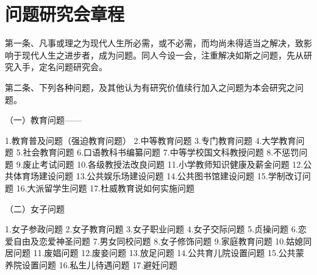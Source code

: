 \section{问题研究会章程}



第一条、凡事或理之为现代人生所必需，或不必需，而均尚未得适当之解决，致影响于现代人生之进步者，成为问题。同人今设一会，注重解决如斯之问题，先从研究入手，定名问题研究会。

第二条、下列各种问题，及其他认为有研究价值续行加入之问题为本会研究之问题。

（一）教育问题——

1.教育普及问题（强迫教育问题）\hspace{1em}
2.中等教育问题\hspace{1em}
3.专门教育问题\hspace{1em}
4.大学教育问题\hspace{1em}
5.社会教育问题\hspace{1em}
6.口语教科书编纂问题\hspace{1em}
7.中等学校国文科教授问题\hspace{1em}
8.不惩罚问题\hspace{1em}
9.废止考试问题\hspace{1em}
10.各级教授法改良问题\hspace{1em}
11.小学教师知识健康及薪金问题\hspace{1em}
12.公共体育场建设问题\hspace{1em}
13.公共娱乐场建设问题\hspace{1em}
14.公共图书馆建设问题\hspace{1em}
15.学制改订问题\hspace{1em}
16.大派留学生问题\hspace{1em}
17.杜威教育说如何实施问题\hspace{1em}

（二）女子问题

1.女子参政问题\hspace{1em}
2.女子教育问题\hspace{1em}
3.女子职业问题\hspace{1em}
4.女子交际问题\hspace{1em}
5.贞操问题\hspace{1em}
6.恋爱自由及恋爱神圣问题\hspace{1em}
7.男女同校问题\hspace{1em}
8.女子修饰问题\hspace{1em}
9.家庭教育问题\hspace{1em}
10.姑媳同居问题\hspace{1em}
11.废娼问题\hspace{1em}
12.废妾问题\hspace{1em}
13.放足问题\hspace{1em}
14.公共育儿院设置问题\hspace{1em}
15.公共蒙养院设置问题\hspace{1em}
16.私生儿待遇问题\hspace{1em}
17.避妊问题 \hspace{1em}

